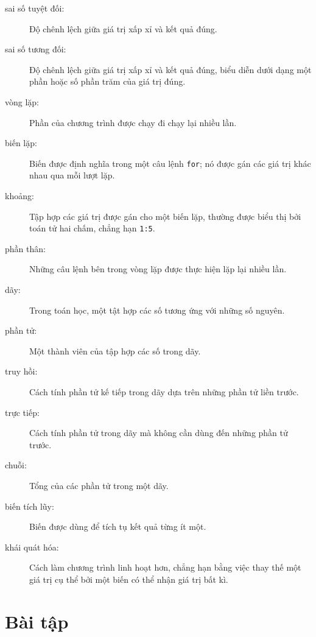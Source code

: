 \documentclass[12pt]{book}
\begin{document}
\begin{description}

\item[sai số tuyệt đối:] Độ chênh lệch giữa giá trị xấp xỉ và kết quả
đúng.

\item[sai số tương đối:] Độ chênh lệch giữa giá trị xấp xỉ và kết quả
đúng, biểu diễn dưới dạng một phần hoặc số phần trăm của giá trị
đúng.

\item[vòng lặp:] Phần của chương trình được chạy đi chạy lại
nhiều lần.

\item[biến lặp:] Biến được định nghĩa trong một câu lệnh {\tt for};
nó được gán các giá trị khác nhau qua mỗi lượt lặp.

\item[khoảng:] Tập hợp các giá trị được gán cho một biến lặp, thường
được biểu thị bởi toán tử hai chấm, chẳng hạn {\tt 1:5}.

\item[phần thân:] Những câu lệnh bên trong vòng lặp được thực hiện
lặp lại nhiều lần.

\item[dãy:] Trong toán học, một tật hợp các số tương ứng với những
số nguyên.

\item[phần tử:] Một thành viên của tập hợp các số trong dãy.

\item[truy hồi:] Cách tính phần tử kế tiếp trong dãy dựa trên những
phần tử liền trước.

\item[trực tiếp:] Cách tính phần tử trong dãy mà không cần dùng đến
những phần tử trước.

\item[chuỗi:] Tổng của các phần tử trong một dãy.

\item[biến tích lũy:] Biến được dùng để tích tụ kết quả từng ít một.

\item[khái quát hóa:] Cách làm chương trình linh hoạt hơn, chẳng hạn
bằng việc thay thế một giá trị cụ thể bởi một biến có thể nhận giá trị
bất kì.

\end{description}


\section{Bài tập}
\end{document}

